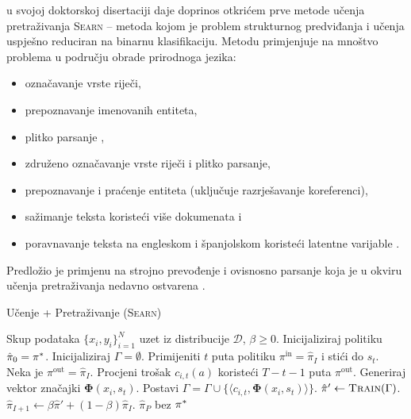 \citet{daume06thesis} u svojoj doktorskoj disertaciji daje doprinos otkrićem
prve metode učenja pretraživanja \textsc{Searn}  --
metoda kojom je problem strukturnog predviđanja i učenja uspješno reduciran na
binarnu klasifikaciju.
Metodu primjenjuje na mnoštvo problema u području obrade prirodnoga jezika:
\begin{itemize}
  \item označavanje vrste riječi,
  \item prepoznavanje imenovanih entiteta,
  \item plitko parsanje ,
  \item združeno označavanje vrste riječi i plitko parsanje,
  \item prepoznavanje i praćenje entiteta (uključuje razrješavanje koreferenci),
  \item sažimanje teksta koristeći više dokumenata i
  \item poravnavanje teksta na engleskom i španjolskom koristeći latentne
  varijable .
\end{itemize}
Predložio je primjenu na strojno prevođenje i ovisnosno parsanje koja je u
okviru učenja pretraživanja nedavno ostvarena
\citep{he2015syntax,chang2015learning}.

\begin{algorithm}
\caption{Učenje + Pretraživanje (\textsc{Searn})}\label{alg:searn}
\begin{algorithmic}[1]
\Require Skup podataka $\{x_i, y_i\}_{i=1}^N$ uzet iz distribucije $\mathcal{D}$,
  $\beta \geq 0$. %
\State Inicijaliziraj politiku $\hat{\pi}_0 = \pi\ssymbol{1}$.
\ForAll{$I \in \big[0,1,2,\ldots,P)$}
    \State Inicijaliziraj $\Gamma = \emptyset$. 
      \State Primijeniti $t$ puta politiku $\pi^{\text{in}} = \hat{\pi}_{I}$  i stići do $s_t$. 
      \label{alg:searn:action}
        \State Neka je  $\pi^{\text{out}} = \hat{\pi}_{I}$.\label{alg:searn:rolloutpolicy}
        \State Procjeni trošak $c_{i,t}(a)$ koristeći $T-t-1$ puta $\pi^{\text{out}}$. \label{alg:searn:rollout}
      \EndFor
      \State Generiraj vektor značajki $\mathbf{\Phi}(x_i, s_t)$.
      \State Postavi $\Gamma = \Gamma \cup \{\langle c_{i,t}, \mathbf{\Phi}(x_i, s_t) \rangle\}$.
    \EndFor
  \EndFor
  \State $\hat{\pi}' \gets \textsc{Train}(\Gamma)$.\label{alg:searn:train}
  \State $\hat{\pi}_{I+1} \gets \beta \hat{\pi}' + (1-\beta) \hat{\pi}_{I}$. \label{alg:searn:mixture}
\EndFor
\State \Return $\hat{\pi}_{P}$ bez $\pi\ssymbol{1}$
\end{algorithmic}
\end{algorithm}

